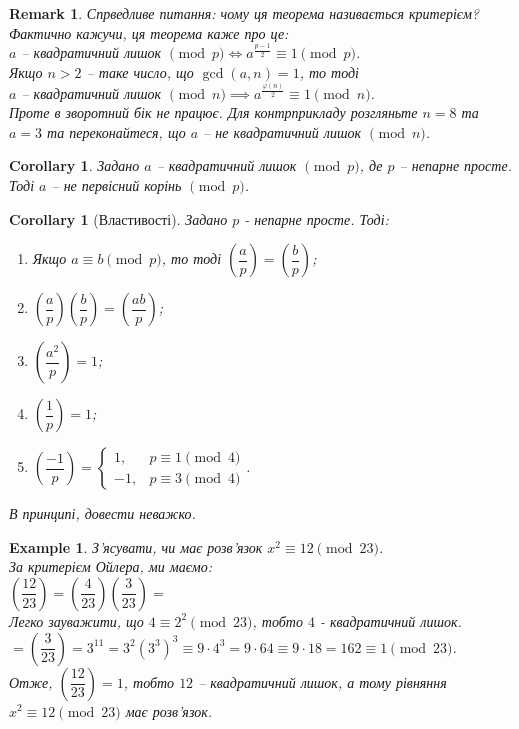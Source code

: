 \documentclass[a4paper, 14pt]{extarticle}
\theoremstyle{theoremdd}
\theoremstyle{theoremdd}
\theoremstyle{theoremdd}
\theoremstyle{theoremdd}
\newtheorem{example}[theorem]{Example}
\theoremstyle{theoremdd}
\theoremstyle{theoremdd}
\newtheorem{remark}[theorem]{Remark}
\theoremstyle{theoremdd}
\theoremstyle{theoremdd}
\newtheorem{corollary}[theorem]{Corollary}
\begin{document}
\begin{remark}
Спрведливе питання: чому ця теорема називається критерієм? Фактично кажучи, ця теорема каже про це:\\
$a$ -- квадратичний лишок $\pmod p \iff a^{\frac{p-1}{2}} \equiv 1 \pmod p$.\\
Якщо $n > 2$ -- таке число, що $\gcd(a,n) = 1$, то тоді\\
$a$ -- квадратичний лишок $\pmod n \implies a^{\frac{\varphi(n)}{2}} \equiv 1 \pmod n$.\\
Проте в зворотний бік не працює. Для контрприкладу розгляньте $n = 8$ та $a = 3$ та переконайтеся, що $a$ -- не квадратичний лишок $\pmod n$.
\end{remark}

\begin{corollary}
Задано $a$ -- квадратичний лишок $\pmod p$, де $p$ -- непарне просте. Тоді $a$ -- не первісний корінь $\pmod p$.
\end{corollary}

\begin{corollary}[Властивості]
Задано $p$ - непарне просте. Тоді:
\begin{enumerate}[nosep,wide=0pt,label={\arabic*)}]
\item Якщо $a \equiv b \pmod p$, то тоді $\left( \dfrac{a}{p} \right) = \left( \dfrac{b}{p} \right)$;
\item $\left( \dfrac{a}{p} \right) \left( \dfrac{b}{p} \right) = \left( \dfrac{ab}{p} \right)$;
\item $\left( \dfrac{a^2}{p} \right) = 1$;
\item $\left( \dfrac{1}{p} \right) = 1$;
\item $\left( \dfrac{-1}{p} \right) = \begin{cases} 1, & p \equiv 1 \pmod 4 \\ -1, & p \equiv 3 \pmod 4 \end{cases}$.
\end{enumerate}
\textit{В принципі, довести неважко.}
\end{corollary}

\begin{example}
З'ясувати, чи має розв'язок $x^2 \equiv 12 \pmod {23}$.\\
За критерієм Ойлера, ми маємо:\\
$\left( \dfrac{12}{23} \right) = \left( \dfrac{4}{23} \right) \left( \dfrac{3}{23} \right) \boxed{=}$\\
Легко зауважити, що $4 \equiv 2^2 \pmod {23}$, тобто $4$ - квадратичний лишок.\\
$\boxed{=} \left( \dfrac{3}{23} \right) = 3^{11} = 3^2 (3^3)^3 \equiv 9 \cdot 4^3 = 9 \cdot 64 \equiv 9 \cdot 18 = 162 \equiv 1 \pmod {23}$.\\
Отже, $\left( \dfrac{12}{23} \right) = 1$, тобто $12$ -- квадратичний лишок, а тому рівняння $x^2 \equiv 12 \pmod {23}$ має розв'язок.
\end{example}
\end{document}
